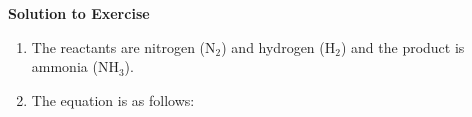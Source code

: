 {\begin{mdframed}[linewidth=4, leftmargin=40, rightmargin=40]
\begin{exercise}
        \vspace{5pt}
        \label{m38726*solfhsst!!!underscore!!!id506}\noindent\textbf{Solution to Exercise } \label{m38726*listfhsst!!!underscore!!!id506}\begin{enumerate}[noitemsep, label=\textbf{Step} \textbf{\arabic*}. ] 
            \leftskip=20pt\rightskip=\leftskip\item  
        \label{m38726*id64383}The reactants are nitrogen (\begin{math}\mathrm{N}{}_{2}\end{math}) and hydrogen (\begin{math}\mathrm{H}{}_{2}\end{math}) and the product is ammonia (\begin{math}\mathrm{NH}{}_{3}\end{math}).\par 
        \item  
        \label{m38726*id64433}The equation is as follows:
        \label{m38726*id76543}\nopagebreak\noindent{}
    

\end{enumerate}
\end{exercise}
\end{mdframed}}
